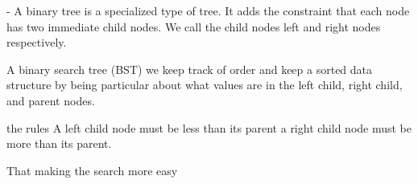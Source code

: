 - A binary tree is 
  a specialized type of tree. 
  It adds the constraint that each node has two immediate child nodes.
  We call the child nodes left and right nodes respectively.

A binary search tree (BST)
  we keep track of order and keep a sorted data structure by being particular about what values are in the left child, right child, and parent nodes.

  the rules
    A left child node must be less than its parent 
    a right child node must be more than its parent.

  That making the search more easy 
